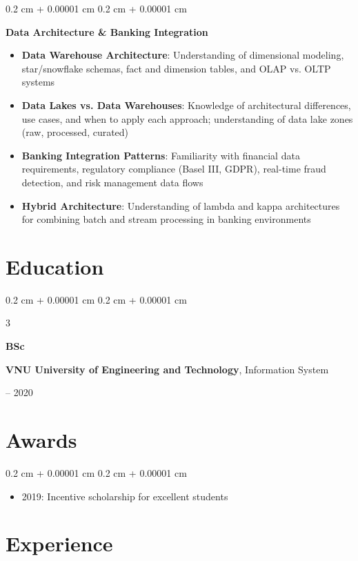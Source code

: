 \documentclass[10pt, letterpaper]{article}
\newenvironment{highlightsforbulletentries}{
    \begin{itemize}[
        topsep=0.10 cm,
        parsep=0.10 cm,
        partopsep=0pt,
        itemsep=0pt,
        leftmargin=10pt
    ]
    }{
    \end{itemize}
} %
\newenvironment{onecolentry}{
    \begin{adjustwidth}{
        0.2 cm + 0.00001 cm
    }{
        0.2 cm + 0.00001 cm
    }
    }{
    \end{adjustwidth}
} %
\newenvironment{threecolentry}[3][]{
    \onecolentry
    \def\thirdColumn{#3}
    \setcolumnwidth{1 cm, \fill, 4.5 cm}
    \begin{paracol}{3}
    {\raggedright #2} \switchcolumn
    }{
    \switchcolumn \raggedleft \thirdColumn
    \end{paracol}
    \endonecolentry
} %
\begin{document}
\begin{onecolentry}
        \vspace{0.2 cm}
        \textbf{Data Architecture \& Banking Integration}
        \begin{highlightsforbulletentries}
            \item \textbf{Data Warehouse Architecture}: Understanding of dimensional modeling, star/snowflake schemas, fact and dimension tables, and OLAP vs. OLTP systems
            \item \textbf{Data Lakes vs. Data Warehouses}: Knowledge of architectural differences, use cases, and when to apply each approach; understanding of data lake zones (raw, processed, curated)
            \item \textbf{Banking Integration Patterns}: Familiarity with financial data requirements, regulatory compliance (Basel III, GDPR), real-time fraud detection, and risk management data flows
            \item \textbf{Hybrid Architecture}: Understanding of lambda and kappa architectures for combining batch and stream processing in banking environments
        \end{highlightsforbulletentries}
    \end{onecolentry}

    \section{Education}
    \begin{threecolentry}{\textbf{BSc}}{
        2016 -- 2020
    }
        \textbf{VNU University of Engineering and Technology}, Information System
    \end{threecolentry}

    \section{Awards}
    \begin{onecolentry}
        \begin{highlightsforbulletentries}
            \item 2019: Incentive scholarship for excellent students
        \end{highlightsforbulletentries}
    \end{onecolentry}

    \section{Experience}
\end{document}
